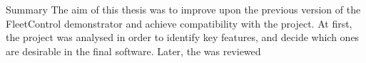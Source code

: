 \chap Summary
The aim of this thesis was to improve upon the previous version of the FleetControl demonstrator and achieve compatibility with the {\mapfIR} project. 
At first, the {\mapfIR} project was analysed in order to identify key features, and decide which ones are desirable in the final software. Later, the {\oldRepo} was reviewed

 